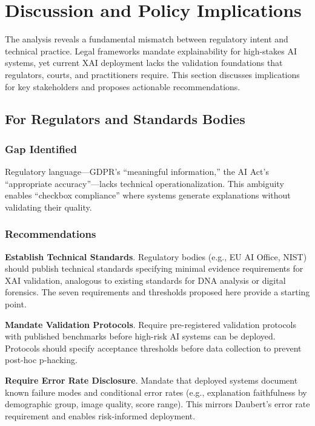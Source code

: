 \section{Discussion and Policy Implications}

The analysis reveals a fundamental mismatch between regulatory intent and technical practice. Legal frameworks mandate explainability for high-stakes AI systems, yet current XAI deployment lacks the validation foundations that regulators, courts, and practitioners require. This section discusses implications for key stakeholders and proposes actionable recommendations.

\subsection{For Regulators and Standards Bodies}

\subsubsection{Gap Identified}

Regulatory language—GDPR's ``meaningful information,'' the AI Act's ``appropriate accuracy''—lacks technical operationalization. This ambiguity enables ``checkbox compliance'' where systems generate explanations without validating their quality.

\subsubsection{Recommendations}

\textbf{Establish Technical Standards}. Regulatory bodies (e.g., EU AI Office, NIST) should publish technical standards specifying minimal evidence requirements for XAI validation, analogous to existing standards for DNA analysis or digital forensics. The seven requirements and thresholds proposed here provide a starting point.

\textbf{Mandate Validation Protocols}. Require pre-registered validation protocols with published benchmarks before high-risk AI systems can be deployed. Protocols should specify acceptance thresholds before data collection to prevent post-hoc p-hacking.

\textbf{Require Error Rate Disclosure}. Mandate that deployed systems document known failure modes and conditional error rates (e.g., explanation faithfulness by demographic group, image quality, score range). This mirrors Daubert's error rate requirement and enables risk-informed deployment.

